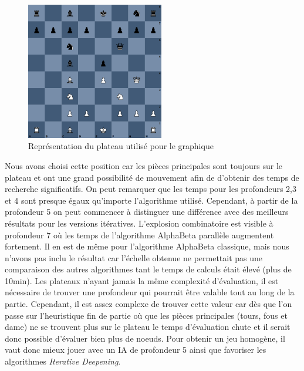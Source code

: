 \documentclass{article}
\begin{document}
\begin{figure}[h]
    \centering
    \includegraphics[width=\textwidth,height=6.0cm,keepaspectratio]{board.png}
    \caption{Représentation du plateau utilisé pour le graphique}
    \label{board}
\end{figure}
\FloatBarrier
Nous avons choisi cette position car les pièces principales sont toujours sur le plateau et ont une grand possibilité de mouvement afin de d'obtenir des temps de recherche significatifs.
On peut remarquer que les temps pour les profondeurs 2,3 et 4 sont presque égaux qu'importe l'algorithme utilisé. Cependant, à partir de la profondeur 5 on peut commencer à distinguer
une différence avec des meilleurs résultats pour les versions itératives. L'explosion combinatoire est visible à profondeur 7 où les temps de l'algorithme AlphaBeta parallèle augmentent fortement. Il en est de même pour l'algorithme AlphaBeta classique,
mais nous n'avons pas inclu le résultat car l'échelle obtenue ne permettait pas une comparaison des autres algorithmes tant le temps de calculs était élevé (plus de 10min). Les plateaux n'ayant jamais
la même complexité d'évaluation, il est nécessaire de trouver une profondeur qui pourrait être valable tout au long de la partie. Cependant, il est assez complexe de trouver cette valeur car dès que l'on
passe sur l'heuristique fin de partie où que les pièces principales (tours, fous et dame) ne se trouvent plus sur le plateau le temps d'évaluation chute et il serait donc possible d'évaluer bien plus de noeuds.
Pour obtenir un jeu homogène, il vaut donc mieux jouer avec un IA de profondeur 5 ainsi que favoriser les algorithmes \textit{Iterative Deepening}.
\end{document}
